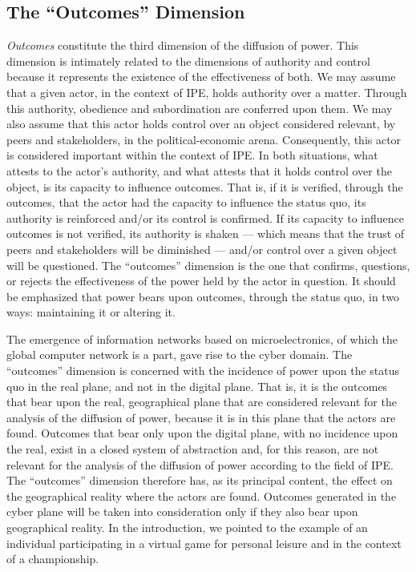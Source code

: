 \subsection{The ``Outcomes'' Dimension}

\textit{Outcomes} constitute the third dimension of the diffusion of power. This dimension is intimately related to the dimensions of authority and control because it represents the existence of the effectiveness of both. We may assume that a given actor, in the context of IPE, holds authority over a matter. Through this authority, obedience and subordination are conferred upon them. We may also assume that this actor holds control over an object considered relevant, by peers and stakeholders, in the political-economic arena. Consequently, this actor is considered important within the context of IPE. In both situations, what attests to the actor's authority, and what attests that it holds control over the object, is its capacity to influence outcomes. That is, if it is verified, through the outcomes, that the actor had the capacity to influence the status quo, its authority is reinforced and/or its control is confirmed. If its capacity to influence outcomes is not verified, its authority is shaken --- which means that the trust of peers and stakeholders will be diminished --- and/or control over a given object will be questioned. The ``outcomes'' dimension is the one that confirms, questions, or rejects the effectiveness of the power held by the actor in question. It should be emphasized that power bears upon outcomes, through the status quo, in two ways: maintaining it or altering it.

The emergence of information networks based on microelectronics, of which the global computer network is a part, gave rise to the cyber domain. The ``outcomes'' dimension is concerned with the incidence of power upon the status quo in the real plane, and not in the digital plane. That is, it is the outcomes that bear upon the real, geographical plane that are considered relevant for the analysis of the diffusion of power, because it is in this plane that the actors are found. Outcomes that bear only upon the digital plane, with no incidence upon the real, exist in a closed system of abstraction and, for this reason, are not relevant for the analysis of the diffusion of power according to the field of IPE. The ``outcomes'' dimension therefore has, as its principal content, the effect on the geographical reality where the actors are found. Outcomes generated in the cyber plane will be taken into consideration only if they also bear upon geographical reality. In the introduction, we pointed to the example of an individual participating in a virtual game for personal leisure and in the context of a championship.

